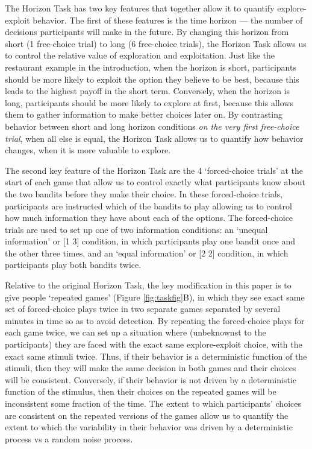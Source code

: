 \documentclass[12pt]{article}
\begin{document}
{	The Horizon Task has two key features that together allow it to quantify explore-exploit behavior. The first of these features is  the time horizon --- the number of decisions participants will make in the future. By changing this horizon from short (1 free-choice trial) to long (6 free-choice trials), the Horizon Task allows us to control the relative value of exploration and exploitation. Just like the restaurant example in the introduction, when the horizon is short, participants should be more likely to exploit the option they believe to be best, because this leads to the highest payoff in the short term. Conversely, when the horizon is long, participants should be more likely to explore at first, because this allows them to gather information to make better choices later on. By contrasting behavior between short and long horizon conditions {\it on the very first free-choice trial}, when all else is equal, the Horizon Task allows us to quantify how behavior changes, when it is more valuable to explore.
	
	The second key feature of the Horizon Task are the 4 `forced-choice trials' at the start of each game that allow us to control exactly what participants know about the two bandits before they make their choice. In these forced-choice trials, participants are instructed which of the bandits to play allowing us to control how much information they have about each of the options. The forced-choice trials are used to set up one of two information conditions: an `unequal information' or [1 3] condition, in which participants play one bandit once and the other three times, and an `equal information' or [2 2] condition, in which participants play both bandits twice.
	
	Relative to the original Horizon Task, the key modification in this paper is to give people `repeated games' (Figure \ref{fig:taskfig}B), in which they see exact same set of forced-choice plays twice in two separate games separated by several minutes in time so as to avoid detection. By repeating the forced-choice plays for each game twice, we can set up a situation where (unbeknownst to the participants) they are faced with the exact same explore-exploit choice, with the exact same stimuli twice. Thus, if their behavior is a deterministic function of the stimuli, then they will make the same decision in both games and their choices will be consistent. Conversely, if their behavior is not driven by a deterministic function of the stimulus, then their choices on the repeated games will be inconsistent some fraction of the time. The extent to which participants' choices are consistent on the repeated versions of the games allow us to quantify the extent to which the variability in their behavior was driven by a deterministic process vs a random noise process.
	
}
\end{document}
